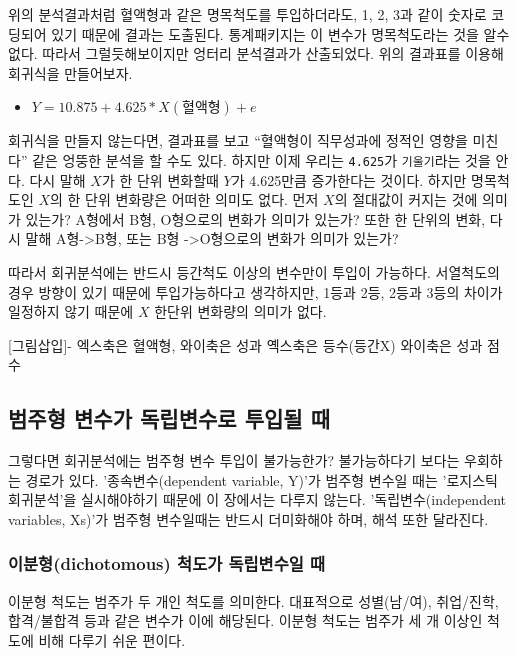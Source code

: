 \documentclass[
]{book}
\providecommand{\tightlist}{%
  \setlength{\itemsep}{0pt}\setlength{\parskip}{0pt}}
\begin{document}
위의 분석결과처럼 혈액형과 같은 명목척도를 투입하더라도, 1, 2, 3과 같이 숫자로 코딩되어 있기 때문에 결과는 도출된다. 통계패키지는 이 변수가 명목척도라는 것을 알수 없다. 따라서 그럴듯해보이지만 엉터리 분석결과가 산출되었다. 위의 결과표를 이용해 회귀식을 만들어보자.

\begin{itemize}
\tightlist
\item
  \(Y=10.875+4.625*X(혈액형)+e\)
\end{itemize}

회귀식을 만들지 않는다면, 결과표를 보고 ``혈액형이 직무성과에 정적인 영향을 미친다'' 같은 엉뚱한 분석을 할 수도 있다. 하지만 이제 우리는 \texttt{4.625}가 \texttt{기울기}라는 것을 안다. 다시 말해 \(X\)가 한 단위 변화할때 \(Y\)가 4.625만큼 증가한다는 것이다. 하지만 명목척도인 \(X\)의 한 단위 변화량은 어떠한 의미도 없다. 먼저 \(X\)의 절대값이 커지는 것에 의미가 있는가? A형에서 B형, O형으로의 변화가 의미가 있는가? 또한 한 단위의 변화, 다시 말해 A형-\textgreater B형, 또는 B형 -\textgreater O형으로의 변화가 의미가 있는가?

따라서 회귀분석에는 반드시 등간척도 이상의 변수만이 투입이 가능하다. 서열척도의 경우 방향이 있기 때문에 투입가능하다고 생각하지만, 1등과 2등, 2등과 3등의 차이가 일정하지 않기 때문에 \(X\) 한단위 변화량의 의미가 없다.

{[}그림삽입{]}- 엑스축은 혈액형, 와이축은 성과
옉스축은 등수(등간X) 와이축은 성과 점수

\subsection{범주형 변수가 독립변수로 투입될 때}\label{uxbc94uxc8fcuxd615-uxbcc0uxc218uxac00-uxb3c5uxb9bduxbcc0uxc218uxb85c-uxd22cuxc785uxb420-uxb54c}

그렇다면 회귀분석에는 범주형 변수 투입이 불가능한가? 불가능하다기 보다는 우회하는 경로가 있다. '종속변수(dependent variable, Y)'가 범주형 변수일 때는 '로지스틱 회귀분석'을 실시해야하기 때문에 이 장에서는 다루지 않는다. '독립변수(independent variables, Xs)'가 범주형 변수일때는 반드시 더미화해야 하며, 해석 또한 달라진다.

\subsubsection{이분형(dichotomous) 척도가 독립변수일 때}\label{uxc774uxbd84uxd615dichotomous-uxcc99uxb3c4uxac00-uxb3c5uxb9bduxbcc0uxc218uxc77c-uxb54c}

이분형 척도는 범주가 두 개인 척도를 의미한다. 대표적으로 성별(남/여), 취업/진학, 합격/불합격 등과 같은 변수가 이에 해당된다. 이분형 척도는 범주가 세 개 이상인 척도에 비해 다루기 쉬운 편이다.
\end{document}
